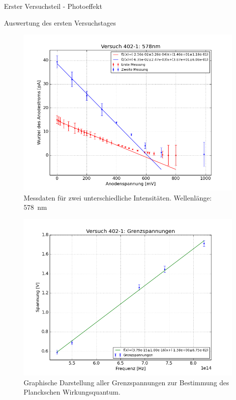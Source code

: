 \documentclass[pdftex, a4paper,11pt, twoside, ngerman]{report}
\begin{document}
\begin{chapter}{Erster Versuchsteil - Photoeffekt}
\begin{section}{Auswertung des ersten Versuchstages}
\begin{figure}[htbp]
\begin{minipage}{0.48\textwidth}
          \centering
          \includegraphics[width=\textwidth]{Figures/Versuch402_1_578.png}
          \caption{Messdaten für zwei unterschiedliche Intensitäten. 
              Wellenlänge: \SI{578}{\nano\meter}}
          \label{fig:Versuch402_1_578}
        \end{minipage}
      \end{figure}
      
      \begin{figure}[htbp]
        \begin{center}
          \includegraphics[width=.8\textwidth]
          {Figures/Versuch402_1_PlanckschesWirkungsquant.png}
          \caption{Graphische Darstellung aller Grenzspannungen zur Bestimmung
              des Planckschen Wirkungsquantum.}
          \label{fig:Versuch402_1_PlanckschesWirkungsquant}
        \end{center}
      \end{figure}
      

\end{section}
\end{chapter}
\end{document}
